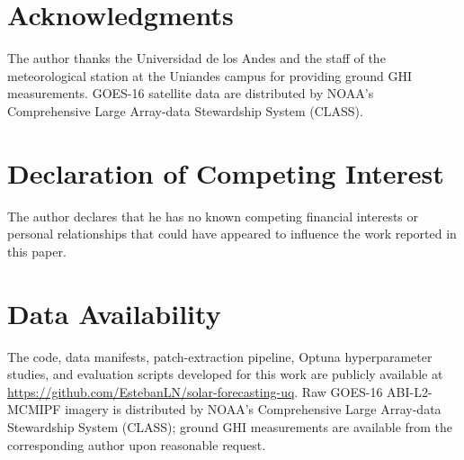 \documentclass[a4paper,fleqn]{cas-sc}
\begin{document}
\section*{Acknowledgments}
The author thanks the Universidad de los Andes and the staff of the meteorological
station at the Uniandes campus for providing ground GHI measurements.
GOES-16 satellite data are distributed by NOAA's Comprehensive Large Array-data
Stewardship System (CLASS).

\section*{Declaration of Competing Interest}
The author declares that he has no known competing financial interests or
personal relationships that could have appeared to influence the work
reported in this paper.

\section*{Data Availability}
The code, data manifests, patch-extraction pipeline, Optuna hyperparameter
studies, and evaluation scripts developed for this work are publicly
available at \url{https://github.com/EstebanLN/solar-forecasting-uq}. Raw
GOES-16 ABI-L2-MCMIPF imagery is distributed by NOAA's Comprehensive Large
Array-data Stewardship System (CLASS); ground GHI measurements are available
from the corresponding author upon reasonable request.




\clearpage
\end{document}
